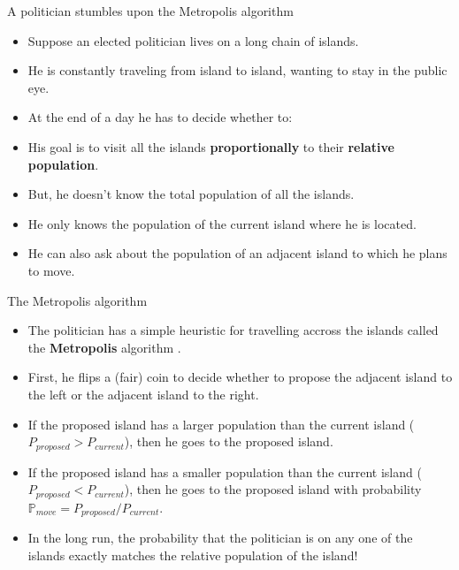 \documentclass[handout]{beamer}
\begin{document}
\begin{frame}{A politician stumbles upon the Metropolis algorithm}
\scriptsize{

\begin{itemize}
\item Suppose an elected politician lives on a long chain of islands.
\item He is constantly traveling from island to island, wanting to stay in the public eye. 
\item At the end of a day he has to decide whether to:


\item His goal is to visit all the islands \textbf{proportionally} to their \textbf{relative population}.

\item But, he doesn't know the total population of all the islands.
\item He only knows the population of the current island where he is located.
\item He can also ask about the population of an adjacent island to which he plans to move.

\end{itemize}


} 
\end{frame}


\begin{frame}{The Metropolis algorithm}
\scriptsize{

\begin{itemize}
\item The politician has a simple heuristic for travelling accross the islands called the \textbf{Metropolis} algorithm \cite{metropolis1953equation}.

\item First, he flips a (fair) coin to decide whether to propose the adjacent island to the left or the adjacent island to the right.

\item If the proposed island has a larger population than
the current island ($P_{proposed}>P_{current}$), then he  goes to the proposed island.

\item If the proposed island has a smaller population than the current island ($P_{proposed}<P_{current}$), then he goes to the proposed island with probability $\mathbb{P}_{move}=P_{proposed}/P_{current}$.


\item In the long run, the probability that the politician is on any one of the islands exactly matches the relative population of the island!

\end{itemize}


} 
\end{frame}
\end{document}
